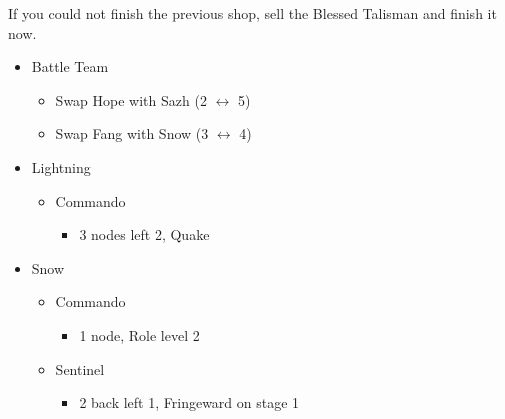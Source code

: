 \newpage
\renewcommand{\first}{[1] Strike Team (\com/\syn/\com)}
\renewcommand{\second}{[2] Tri-Disaster (\rav/\rav/\rav)}
\renewcommand{\third}{[3] Strategic Warfare (\com/\syn/\sen)}
\renewcommand{\fourth}{[4] Tri-Disaster (\rav/\rav/\rav)}
\renewcommand{\fifth}{[5] Cerberus (\com/\com/\com)}
\renewcommand{\sixth}{[6] Cerberus (\com/\com/\com)}
\begin{multicols}{2}
If you could not finish the previous shop, sell the Blessed Talisman and finish it now.
\begin{menu}
\begin{itemize}
    \paradigm
    \begin{itemize}
        \item Battle Team
        \begin{itemize}
            \item Swap Hope with Sazh (2 $\leftrightarrow$ 5)
            \item Swap Fang with Snow (3 $\leftrightarrow$ 4)
        \end{itemize}
{\paradigmline[1]{\textit{\com}}{\textit{\syn}}{\textit{(\com)}}}%
{\paradigmline{(\rav)}{\rav}{\rav}}%
{\paradigmline{(\com)}{\syn}{\sen}}%
{\paradigmline{[\rav]}{(\rav)}{(\rav)}}%
{\paradigmline{\com}{[\com]}{\com}}%
{\paradigmline{\com}{[\com]}{\com}}
    \end{itemize}
    \crystarium
    \begin{itemize}
        \item Lightning
        \begin{itemize}
            \item Commando
            \begin{itemize}
                \item 3 nodes left 2, Quake
            \end{itemize}
        \end{itemize}
        \item Snow
        \begin{itemize}
            \item Commando
            \begin{itemize}
                \item 1 node, Role level 2
            \end{itemize}
            \item Sentinel
            \begin{itemize}
                \item 2 back left 1, Fringeward on stage 1

\end{itemize}
\end{itemize}
\end{itemize}
\end{itemize}
\end{menu}
\end{multicols}
